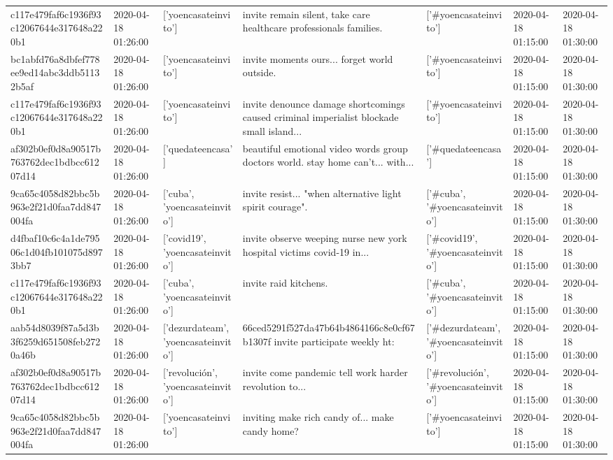 \begin{tabular}{lllllll}
c117e479faf6c1936f93c12067644e317648a220b1 & 2020-04-18 01:26:00 & ['yoencasateinvito'] & invite remain silent, take care healthcare professionals families. & ['#yoencasateinvito'] & 2020-04-18 01:15:00 & 2020-04-18 01:30:00 \\
bc1abfd76a8dbfef778ee9ed14abc3ddb51132b5af & 2020-04-18 01:26:00 & ['yoencasateinvito'] & invite moments ours... forget world outside. & ['#yoencasateinvito'] & 2020-04-18 01:15:00 & 2020-04-18 01:30:00 \\
c117e479faf6c1936f93c12067644e317648a220b1 & 2020-04-18 01:26:00 & ['yoencasateinvito'] & invite denounce damage shortcomings caused criminal imperialist blockade small island... & ['#yoencasateinvito'] & 2020-04-18 01:15:00 & 2020-04-18 01:30:00 \\
af302b0ef0d8a90517b763762dec1bdbcc61207d14 & 2020-04-18 01:26:00 & ['quedateencasa'] & beautiful emotional video words group doctors world. stay home can't... with... & ['#quedateencasa'] & 2020-04-18 01:15:00 & 2020-04-18 01:30:00 \\
9ca65c4058d82bbc5b963e2f21d0faa7dd847004fa & 2020-04-18 01:26:00 & ['cuba', 'yoencasateinvito'] & invite resist... "when alternative light spirit courage". & ['#cuba', '#yoencasateinvito'] & 2020-04-18 01:15:00 & 2020-04-18 01:30:00 \\
d4fbaf10c6c4a1de79506c1d04fb101075d8973bb7 & 2020-04-18 01:26:00 & ['covid19', 'yoencasateinvito'] & invite observe weeping nurse new york hospital victims covid-19 in... & ['#covid19', '#yoencasateinvito'] & 2020-04-18 01:15:00 & 2020-04-18 01:30:00 \\
c117e479faf6c1936f93c12067644e317648a220b1 & 2020-04-18 01:26:00 & ['cuba', 'yoencasateinvito'] & invite raid kitchens. & ['#cuba', '#yoencasateinvito'] & 2020-04-18 01:15:00 & 2020-04-18 01:30:00 \\
aab54d8039f87a5d3b3f6259d651508feb2720a46b & 2020-04-18 01:26:00 & ['dezurdateam', 'yoencasateinvito'] & 66ced5291f527da47b64b4864166c8e0cf67b1307f invite participate weekly ht: & ['#dezurdateam', '#yoencasateinvito'] & 2020-04-18 01:15:00 & 2020-04-18 01:30:00 \\
af302b0ef0d8a90517b763762dec1bdbcc61207d14 & 2020-04-18 01:26:00 & ['revolución', 'yoencasateinvito'] & invite come pandemic tell work harder revolution to... & ['#revolución', '#yoencasateinvito'] & 2020-04-18 01:15:00 & 2020-04-18 01:30:00 \\
9ca65c4058d82bbc5b963e2f21d0faa7dd847004fa & 2020-04-18 01:26:00 & ['yoencasateinvito'] & inviting make rich candy of... make candy home? & ['#yoencasateinvito'] & 2020-04-18 01:15:00 & 2020-04-18 01:30:00 \\

\end{tabular}
